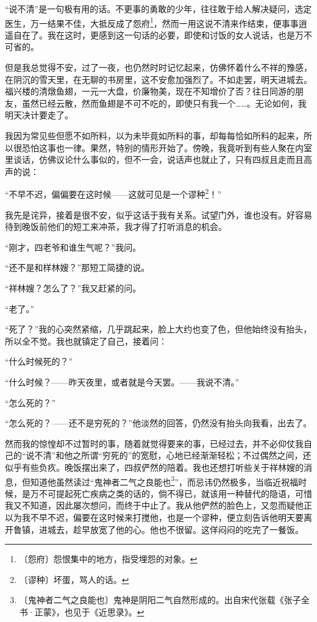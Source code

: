 \documentclass[12pt,UTF-8,openany]{ctexbook}
\begin{document}
\begin{large}
    “说不清”是一句极有用的话。不更事的勇敢的少年，往往敢于给人解决疑问，选定医生，万一结果不佳，大抵反成了怨府\footnote{〔怨府〕怨恨集中的地方，指受埋怨的对象。}，然而一用这说不清来作结束，便事事逍遥自在了。我在这时，更感到这一句话的必要，即使和讨饭的女人说话，也是万不可省的。
    
    但是我总觉得不安，过了一夜，也仍然时时记忆起来，仿佛怀着什么不祥的豫感，在阴沉的雪天里，在无聊的书房里，这不安愈加强烈了。不如走罢，明天进城去。福兴楼的清燉鱼翅，一元一大盘，价廉物美，现在不知增价了否？往日同游的朋友，虽然已经云散，然而鱼翅是不可不吃的，即使只有我一个……。无论如何，我明天决计要走了。
    
    我因为常见些但愿不如所料，以为未毕竟如所料的事，却每每恰如所料的起来，所以很恐怕这事也一律。果然，特别的情形开始了。傍晚，我竟听到有些人聚在内室里谈话，仿佛议论什么事似的，但不一会，说话声也就止了，只有四叔且走而且高声的说：
    
    “不早不迟，偏偏要在这时候——这就可见是一个谬种\footnote{〔谬种〕坏蛋，骂人的话。}！”
    
    我先是诧异，接着是很不安，似乎这话于我有关系。试望门外，谁也没有。好容易待到晚饭前他们的短工来冲茶，我才得了打听消息的机会。
    
    “刚才，四老爷和谁生气呢？”我问。
    
    “还不是和样林嫂？”那短工简捷的说。
    
    “祥林嫂？怎么了？”我又赶紧的问。
    
    “老了。”
    
    “死了？”我的心突然紧缩，几乎跳起来，脸上大约也变了色，但他始终没有抬头，所以全不觉。我也就镇定了自己，接着问：
    
    “什么时候死的？”
    
    “什么时候？——昨天夜里，或者就是今天罢。——我说不清。”
    
    “怎么死的？”
    
    “怎么死的？——还不是穷死的？”他淡然的回答，仍然没有抬头向我看，出去了。
    
    然而我的惊惶却不过暂时的事，随着就觉得要来的事，已经过去，并不必仰仗我自己的“说不清”和他之所谓“穷死的”的宽慰，心地已经渐渐轻松；不过偶然之间，还似乎有些负疚。晚饭摆出来了，四叔俨然的陪着。我也还想打听些关于祥林嫂的消息，但知道他虽然读过“鬼神者二气之良能也\footnote{〔鬼神者二气之良能也〕鬼神是阴阳二气自然形成的。出自宋代张载《张子全书·正蒙》，也见于《近思录》。}”，而忌讳仍然极多，当临近祝福时候，是万不可提起死亡疾病之类的话的，倘不得已，就该用一种替代的隐语，可惜我又不知道，因此屡次想问，而终于中止了。我从他俨然的脸色上，又忽而疑他正以为我不早不迟，偏要在这时候来打搅他，也是一个谬种，便立刻告诉他明天要离开鲁镇，进城去，趁早放宽了他的心。他也不很留。这佯闷闷的吃完了一餐饭。
    

\end{large}
\end{document}
